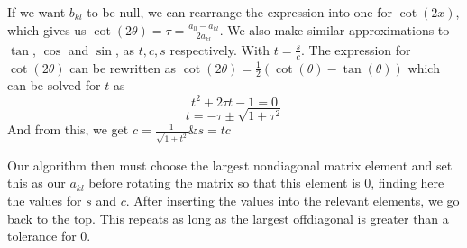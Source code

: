 \documentclass[10pt, twocolumn]{article}
\begin{document}
If we want $b_{kl}$ to be null, we can rearrange the expression into one for $\cot(2x)$\cite{rottmann2006matematisk}, 
which gives us $\cot(2\theta) = \tau = \frac{a_{ll} - a_{kl}}{2a_{kl}}$. We also make similar approximations to 
$\tan$, $\cos$ and $\sin$, as $t, c, s$ respectively. With $t = \frac{s}{c} $. The expression for $\cot(2\theta)$
can be rewritten as $\cot(2\theta) = \frac{1}{2}(\cot(\theta) - \tan(\theta))$ which can be solved for $t$ as 
\[ t^2 + 2\tau t - 1 = 0 \]
\[ t = - \tau \pm \sqrt{1 + \tau^2} \]
And from this, we get $c = \frac{1}{\sqrt{1 + t^2}} \& s = tc$

Our algorithm then must choose the largest nondiagonal matrix element and set this as our $a_{kl}$ before rotating the 
matrix so that this element is 0, finding here the values for $s$ and $c$. After inserting the values into the 
relevant elements, we go back to the top. This repeats as long as the largest offdiagonal is greater than a tolerance 
for 0.

\begin{algorithm}
\end{algorithm}

\end{document}
